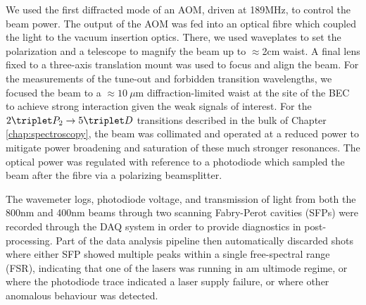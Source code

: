 	We used the first diffracted mode of an AOM, driven at 189MHz, to control the beam power.
	The output of the AOM was fed into an optical fibre which coupled the light to the vacuum insertion optics.
	There, we used waveplates to set the polarization and a telescope to magnify the beam up to $\approx$2cm waist.
	A final lens fixed to a three-axis translation mount was used to focus and align the beam.
	For the measurements of the tune-out and forbidden transition wavelengths, we focused the beam to a $\approx 10~\mu$m diffraction-limited waist at the site of the BEC to achieve strong interaction given the weak signals of interest.
	For the $2\triplet P_2\rightarrow 5\triplet D$ transitions described in the bulk of Chapter \ref{chap:spectroscopy}, the beam was collimated and operated at a reduced power to mitigate power broadening and saturation of these much stronger resonances.
	The optical power was regulated with reference to a photodiode which sampled the beam after the fibre via a polarizing beamsplitter.

	The wavemeter logs, photodiode voltage, and transmission of light from both the 800nm and 400nm beams through two scanning Fabry-Perot cavities (SFPs) were recorded through the DAQ system in order to provide diagnostics in post-processing.
	Part of the data analysis pipeline then automatically discarded shots where either SFP showed multiple peaks within a single free-spectral range (FSR), indicating that one of the lasers was running in am ultimode regime, or where the photodiode trace indicated a laser supply failure, or where other anomalous behaviour was detected.

